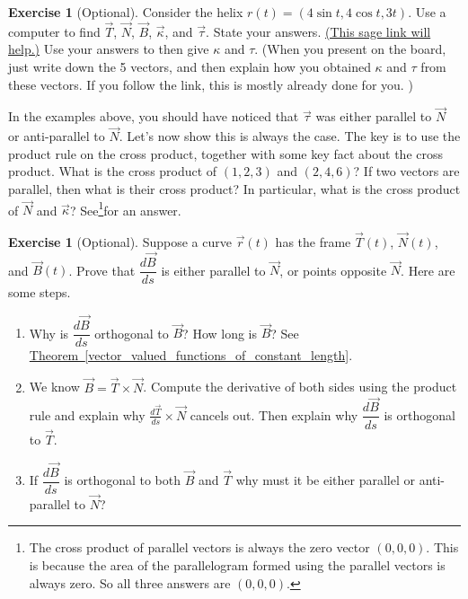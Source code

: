 \documentclass[10pt,]{book}
\theoremstyle{plain}
\theoremstyle{definition}
\theoremstyle{definition}
\theoremstyle{definition}
\theoremstyle{definition}
\newtheorem{exploration}[project]{Exercise}
\theoremstyle{definition}
\numberwithin{equation}{section}
\newcommand{\sageurlforcurvature}{http://bmw.byuimath.com/dokuwiki/doku.php?id=curvature_calculator}
\begin{document}
\begin{exploration}[Optional]\label{exploration-188}
Consider the helix \(r(t)=(4\sin t, 4\cos t, 3t)\). Use a computer to find \(\vec T\), \(\vec N\), \(\vec B\), \(\vec \kappa\), and \(\vec \tau\). State your answers. \href{\\sageurlforcurvature}{(This sage link will help.)} Use your answers to then give \(\kappa\) and \(\tau\). (When you present on the board, just write down the 5 vectors, and then explain how you obtained \(\kappa\) and \(\tau\) from these vectors. If you follow the link, this is mostly already done for you. )%
\end{exploration}
In the examples above, you should have noticed that \(\vec \tau\) was either parallel to \(\vec N\) or anti-parallel to \(\vec N\). Let's now show this is always the case. The key is to use the product rule on the cross product, together with some key fact about the cross product.%
What is the cross product of \((1,2,3)\) and \((2,4,6)\)? If two vectors are parallel, then what is their cross product? In particular, what is the cross product of \(\vec N\) and \(\vec \kappa\)? See\footnote{The cross product of parallel vectors is always the zero vector \((0,0,0)\). This is because the area of the parallelogram formed using the parallel vectors is always zero. So all three answers are \((0,0,0)\).\label{fn-16}}for an answer.%
\begin{exploration}[Optional]\label{exploration-189}
Suppose a curve \(\vec r(t)\) has the frame \(\vec T(t)\), \(\vec N(t)\), and \(\vec B(t)\). Prove that \(\dfrac{d\vec B}{ds}\) is either parallel to \(\vec N\), or points opposite \(\vec N\). Here are some steps. \leavevmode%
\begin{itemize}[label=\textbullet]
\begin{enumerate}[font=\bfseries,label=(\alph*),ref=\alph*]
\item\label{task-461} Why is \(\dfrac{d\vec B}{ds}\) orthogonal to \(\vec B\)? How long is \(\vec B\)? See \hyperref[vector_valued_functions_of_constant_length]{Theorem~\ref{vector_valued_functions_of_constant_length}}.%
%
\item\label{task-462} We know \(\vec B=\vec T\times \vec N\). Compute the derivative of both sides using the product rule and explain why \(\frac{d\vec T}{ds}\times \vec N\) cancels out. Then explain why \(\dfrac{d\vec B}{ds}\) is orthogonal to \(\vec T\).%
\item\label{task-463} If \(\dfrac{d\vec B}{ds}\) is orthogonal to both \(\vec B\) and \(\vec T\) why must it be either parallel or anti-parallel to \(\vec N\)?%
\end{enumerate}
\end{itemize}
%
\end{exploration}
\end{document}
